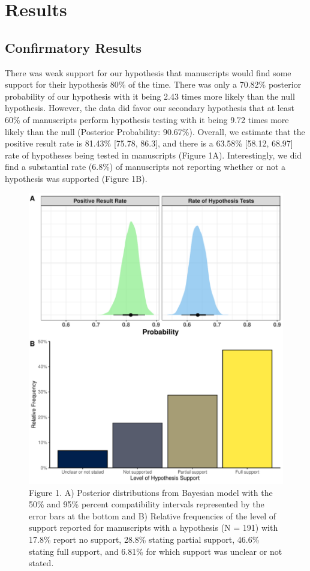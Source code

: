 \documentclass[]{cik}%
\begin{document}
\newpage

\hypertarget{results}{%
\section{Results}\label{results}}

\hypertarget{confirmatory-results}{%
\subsection{Confirmatory Results}\label{confirmatory-results}}

There was weak support for our hypothesis that manuscripts would find
some support for their hypothesis 80\% of the time. There was only a
70.82\% posterior probability of our hypothesis with it being 2.43 times
more likely than the null hypothesis. However, the data did favor our
secondary hypothesis that at least 60\% of manuscripts perform
hypothesis testing with it being 9.72 times more likely than the null
(Posterior Probability: 90.67\%). Overall, we estimate that the positive
result rate is 81.43\% {[}75.78, 86.3{]}, and there is a 63.58\%
{[}58.12, 68.97{]} rate of hypotheses being tested in manuscripts
(Figure 1A). Interestingly, we did find a substantial rate (6.8\%) of
manuscripts not reporting whether or not a hypothesis was supported
(Figure 1B).

\begin{figure}[H]
\includegraphics[width=0.9\linewidth]{figure1} \caption{Figure 1. A) Posterior distributions from Bayesian model with the 50\% and 95\% percent compatibility intervals represented by the error bars at the bottom and B) Relative frequencies of the level of support reported for manuscripts with  a hypothesis (N = 191) with 17.8\% report no support, 28.8\% stating partial support, 46.6\% stating full support, and  6.81\% for which support was unclear or not stated.}\label{fig:fig1}
\end{figure}
\end{document}
